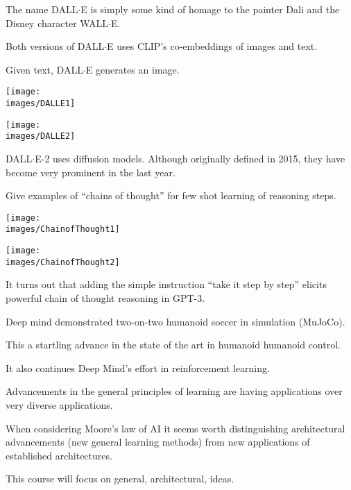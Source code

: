 {


The name DALL$\cdot$E is simply some kind of homage to the painter Dali and the Disney character WALL$\cdot$E.

\vfill
Both versions of DALL$\cdot$E uses CLIP's co-embeddings of images and text.

\vfill
Given text, DALL$\cdot$E generates an image.


\centerline{\texttt{[image: \\images/DALLE1]}}


\centerline{\texttt{[image: \\images/DALLE2]}}


DALL$\cdot$E-2 uses diffusion models.  Although originally defined in 2015, they have become very prominent in the last year.


Give examples of ``chains of thought'' for few shot learning of reasoning steps.


\centerline{\texttt{[image: \\images/ChainofThought1]}}


\centerline{\texttt{[image: \\images/ChainofThought2]}}


It turns out that adding the simple instruction ``take it step by step'' elicits powerful chain of thought reasoning in GPT-3.


Deep mind demonstrated two-on-two humanoid soccer in simulation (MuJoCo).

\vfill
This a startling advance in the state of the art in humanoid humanoid control.

\vfill
It also continues Deep Mind's effort in reinforcement learning.


Advancements in the general principles of learning are having applications over very diverse applications.

\vfill
When considering Moore's law of AI it seems worth distinguishing architectural advancements (new general learning methods)
from new applications of established architectures.

\vfill
This course will focus on general, architectural, ideas.


}

